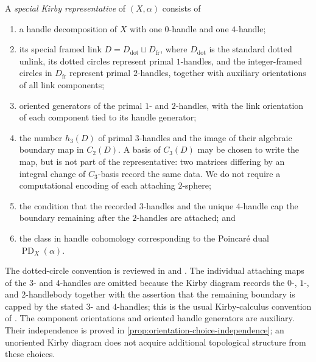 \begin{definition}
\label{def:special-kirby-representative}
A \emph{special Kirby representative} of $(X,\alpha)$ consists of
\begin{enumerate}[label=(\roman*),ref=\roman*]
  \item\label{item:special-handles}
  a handle decomposition of $X$ with one $0$-handle and one $4$-handle;

  \item\label{item:special-diagram}
  its special framed link $D=D_{\mathrm{dot}}\sqcup D_{\mathrm{fr}}$, where
  $D_{\mathrm{dot}}$ is the standard dotted unlink, its dotted circles
  represent primal $1$-handles, and
  the integer-framed circles in $D_{\mathrm{fr}}$ represent primal
  $2$-handles, together with auxiliary orientations of all link components;

  \item\label{item:special-oriented-bases}
  oriented generators of the primal $1$- and $2$-handles, with the link
  orientation of each component tied to its handle generator;

  \item\label{item:special-three-handles}
  the number $h_3(D)$ of primal $3$-handles and the image of their algebraic
  boundary map in $C_2(D)$.  A basis of $C_3(D)$ may be chosen to write the
  map, but is not part of the representative: two matrices differing by an
  integral change of $C_3$-basis record the same data.  We do not require a
  computational encoding of each attaching $2$-sphere;

  \item\label{item:special-closing}
  the condition that the recorded $3$-handles and the unique $4$-handle cap
  the boundary remaining after the $2$-handles are attached; and

  \item\label{item:special-marking}
  the class in handle cohomology corresponding to the Poincar\'e dual
  $\operatorname{PD}_X(\alpha)$.
\end{enumerate}
The dotted-circle convention is reviewed in
\cite[Section~5.4]{GompfStipsicz1999} and
\cite[Section~2.3.2]{BarenzBarrett2018}.  The individual attaching maps of
the $3$- and $4$-handles are omitted because the Kirby diagram records the
$0$-, $1$-, and $2$-handlebody together with the assertion that the remaining
boundary is capped by the stated $3$- and $4$-handles; this is the usual
Kirby-calculus convention of \cite[Sections~4.2 and~5.4]{GompfStipsicz1999}.
The component orientations and oriented handle generators are auxiliary.
Their independence is proved in
\cref{prop:orientation-choice-independence}; an unoriented Kirby diagram does
not acquire additional topological structure from these choices.
\end{definition}

